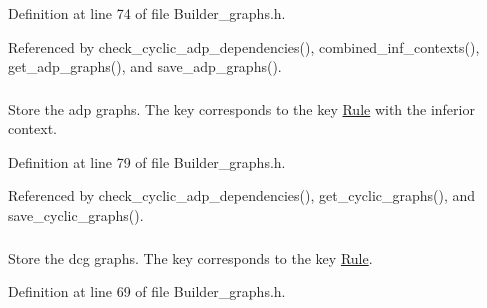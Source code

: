 Definition at line 74 of file Builder\_\-graphs.h.

Referenced by check\_\-cyclic\_\-adp\_\-dependencies(), combined\_\-inf\_\-contexts(), get\_\-adp\_\-graphs(), and save\_\-adp\_\-graphs().\hypertarget{classgenevalmag_1_1Builder__graphs_54a45b424086582d4ed7bb99b948a956}{
\subsubsection[{p\_\-Adp\_\-subgraphs\_\-cyclics}]{}}
\label{classgenevalmag_1_1Builder__graphs_54a45b424086582d4ed7bb99b948a956}


Store the adp graphs. The key corresponds to the key \hyperlink{classgenevalmag_1_1Rule}{Rule} with the inferior context. 



Definition at line 79 of file Builder\_\-graphs.h.

Referenced by check\_\-cyclic\_\-adp\_\-dependencies(), get\_\-cyclic\_\-graphs(), and save\_\-cyclic\_\-graphs().\hypertarget{classgenevalmag_1_1Builder__graphs_fe54574f0045851288fae27ce01a8f4f}{
\subsubsection[{p\_\-Dcg\_\-graphs}]{}}
\label{classgenevalmag_1_1Builder__graphs_fe54574f0045851288fae27ce01a8f4f}


Store the dcg graphs. The key corresponds to the key \hyperlink{classgenevalmag_1_1Rule}{Rule}. 



Definition at line 69 of file Builder\_\-graphs.h.


